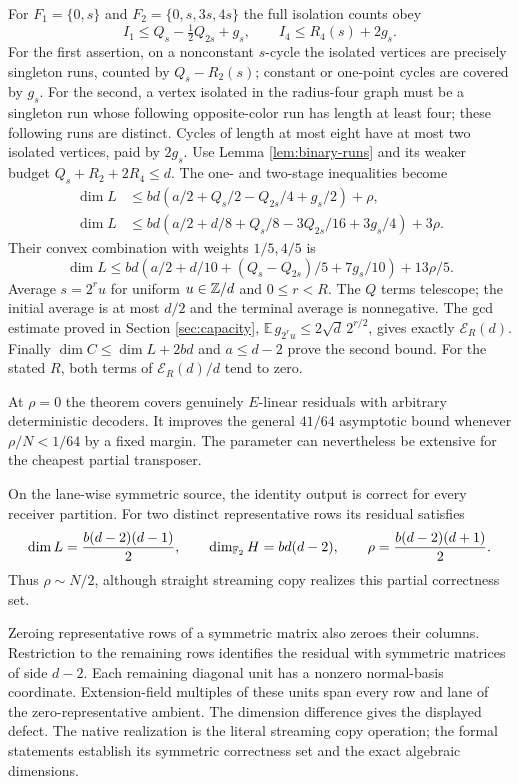 \begin{outline}
For $F_1=\{0,s\}$ and $F_2=\{0,s,3s,4s\}$ the full isolation counts obey
\[
 I_1\le Q_s-\tfrac12Q_{2s}+g_s,\qquad
 I_4\le R_4(s)+2g_s.
\]
For the first assertion, on a nonconstant $s$-cycle the isolated vertices
are precisely singleton runs, counted by $Q_s-R_2(s)$; constant or
one-point cycles are covered by $g_s$. For the second, a vertex isolated
in the radius-four graph must be a singleton run whose following
opposite-color run has length at least four; these following runs are
distinct. Cycles of length at most eight have at most two isolated
vertices, paid by $2g_s$. Use Lemma \ref{lem:binary-runs} and its weaker
budget $Q_s+R_2+2R_4\le d$. The one- and two-stage inequalities become
\begin{align*}
 \dim L&\le bd(a/2+Q_s/2-Q_{2s}/4+g_s/2)+\rho,\\
 \dim L&\le bd(a/2+d/8+Q_s/8-3Q_{2s}/16+3g_s/4)+3\rho.
\end{align*}
Their convex combination with weights $1/5,4/5$ is
\[
 \dim L\le bd\left(a/2+d/10+(Q_s-Q_{2s})/5+7g_s/10\right)+13\rho/5.
\]
Average $s=2^ru$ for uniform $u\in\mathbb{Z}/d$ and $0\le r<R$.
The $Q$ terms telescope; the initial average is at most $d/2$ and the
terminal average is nonnegative. The gcd estimate proved in Section
\ref{sec:capacity}, $\mathbb E\,g_{2^ru}\le2\sqrt d\,2^{r/2}$,
gives exactly $\mathcal E_R(d)$. Finally
$\dim C\le\dim L+2bd$ and $a\le d-2$ prove the second bound.
For the stated $R$, both terms of $\mathcal E_R(d)/d$ tend to zero.
\end{outline}

At $\rho=0$ the theorem covers genuinely $E$-linear residuals with
arbitrary deterministic decoders. It improves the general $41/64$
asymptotic bound whenever $\rho/N<1/64$ by a fixed margin. The parameter
can nevertheless be extensive for the cheapest partial transposer.

\begin{proposition}\label{prop:symmetric-closure}
On the lane-wise symmetric source, the identity output is correct for every
receiver partition. For two distinct representative rows its residual satisfies
\[
 \dim L=\frac{b(d-2)(d-1)}2,\qquad
 \dim_{\mathbb{F}_2}H=bd(d-2),\qquad
 \rho=\frac{b(d-2)(d+1)}2.
\]
Thus $\rho\sim N/2$, although straight streaming copy realizes this
partial correctness set.
\end{proposition}
\begin{outline}
Zeroing representative rows of a symmetric matrix also zeroes their columns.
Restriction to the remaining rows identifies the residual with symmetric
matrices of side $d-2$. Each remaining diagonal unit has a nonzero
normal-basis coordinate. Extension-field multiples of these units span every
row and lane of the zero-representative ambient. The dimension difference
gives the displayed defect. The native realization is the literal streaming
copy operation; the formal statements establish its symmetric correctness
set and the exact algebraic dimensions.
\end{outline}

